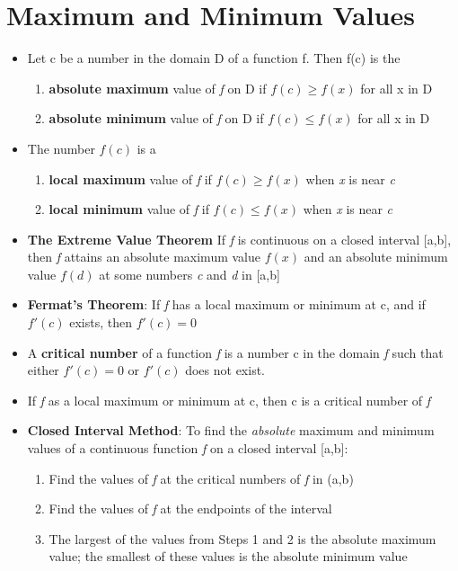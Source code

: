 \documentclass{report}
\begin{document}
		\section{Maximum and Minimum Values}
			\begin{itemize}\addtolength{\leftskip}{2em}
				\item Let c be a number in the domain D of a function f. Then f(c) is the
				\begin{enumerate}\addtolength{\leftskip}{4em}
					\item \textbf{absolute maximum} value of \textit{f} on D if $f(c)\ge f(x)$ for all x in D
					\item \textbf{absolute minimum} value of \textit{f} on D if $f(c)\le f(x)$ for all x in D
				\end{enumerate}
				\item The number $f(c)$ is a 
				\begin{enumerate}\addtolength{\leftskip}{4em}
					\item \textbf{local maximum} value of \textit{f} if $f(c)\ge f(x)$ when \textit{x} is near \textit{c}
					\item \textbf{local minimum} value of \textit{f} if $f(c)\le f(x)$ when \textit{x} is near \textit{c}
				\end{enumerate}
				\item \textbf{The Extreme Value Theorem} If \textit{f} is continuous on a closed interval [a,b], then \textit{f} attains an absolute maximum value $f(x)$ and an absolute minimum value $f(d)$ at some numbers \textit{c} and \textit{d} in [a,b]
				\item \textbf{Fermat's Theorem}: If \textit{f} has a local maximum or minimum at c, and if $f'(c)$ exists, then $f'(c)=0$
				\item A \textbf{critical number} of a function \textit{f} is a number c in the domain \textit{f} such that either $f'(c)=0$ or $f'(c)$ does not exist.
				\item If \textit{f} as a local maximum or minimum at c, then c is a critical number of \textit{f}
				\item \textbf{Closed Interval Method}: To find the \textit{absolute} maximum and minimum values of a continuous function \textit{f} on a closed interval [a,b]:
				\begin{enumerate}\addtolength{\leftskip}{4em}
				\item Find the values of \textit{f} at the critical numbers of \textit{f} in (a,b)
				\item Find the values of \textit{f} at the endpoints of the interval
				\item The largest of the values from Steps 1 and 2 is the absolute maximum value; the smallest of these values is the absolute minimum value
				\end{enumerate}
			\end{itemize}
\end{document}
